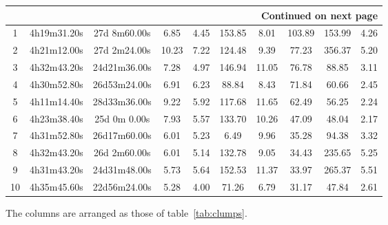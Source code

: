 \documentclass[12pt,preprint]{aastex}
\begin{document}
\begin{longtable}[htb]{|c|c|c|c|c|c|c|c|c|c|}
\endhead

\hline \multicolumn{10}{|r|}{{Continued on next page}} \\ \hline

\endfoot


\endlastfoot
\hline\hline

  1 &  4h19m31.20s & 27d 8m60.00s &   6.85 &   4.45 & 153.85 &   8.01 & 103.89 & 153.99 &   4.26 \\
   2 &  4h21m12.00s & 27d 2m24.00s &  10.23 &   7.22 & 124.48 &   9.39 &  77.23 & 356.37 &   5.20 \\
   3 &  4h32m43.20s & 24d21m36.00s &   7.28 &   4.97 & 146.94 &  11.05 &  76.78 &  88.85 &   3.11 \\
   4 &  4h30m52.80s & 26d53m24.00s &   6.91 &   6.23 &  88.84 &   8.43 &  71.84 &  60.66 &   2.45 \\
   5 &  4h11m14.40s & 28d33m36.00s &   9.22 &   5.92 & 117.68 &  11.65 &  62.49 &  56.25 &   2.24 \\
   6 &  4h23m38.40s & 25d 0m 0.00s &   7.93 &   5.57 & 133.70 &  10.26 &  47.09 &  48.04 &   2.17 \\
   7 &  4h31m52.80s & 26d17m60.00s &   6.01 &   5.23 &   6.49 &   9.96 &  35.28 &  94.38 &   3.32 \\
   8 &  4h32m43.20s & 26d 2m60.00s &   6.01 &   5.14 & 132.78 &   9.05 &  34.43 & 235.65 &   5.25 \\
   9 &  4h31m43.20s & 24d31m48.00s &   5.73 &   5.64 & 152.53 &  11.37 &  33.97 & 265.37 &   5.51 \\
  10 &  4h35m45.60s & 22d56m24.00s &   5.28 &   4.00 &  71.26 &   6.79 &  31.17 &  47.84 &   2.61 \\
\hline
\end{longtable}
{\footnotesize The columns are arranged as those of table~\ref{tab:clumps}. }
\end{document}
